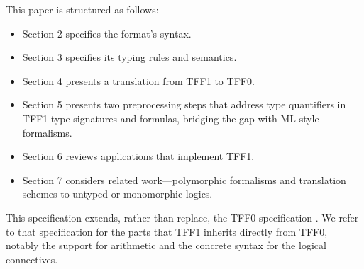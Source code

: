 This paper is structured as follows:
\begin{itemize}
\item Section 2 specifies the format's syntax.
\item Section 3 specifies its typing rules and semantics.
\item Section 4 presents a translation from TFF1 to TFF0.
\item Section 5 presents two preprocessing steps that address type quantifiers
in TFF1 type signatures and formulas, bridging the gap with ML-style
formalisms. %
\item Section 6 reviews applications that implement TFF1.
\item Section 7 considers related work---polymorphic formalisms and translation
schemes to untyped or monomorphic logics.
\end{itemize}

This specification extends, rather than replace, the TFF0 specification
\cite{sutcliffe-et-al-2011-tff0}. We refer to that specification for the parts
that TFF1 inherits directly from TFF0, notably the support for arithmetic and
the concrete syntax for the logical connectives.
